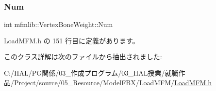 \mbox{\label{classmfmlib_1_1_vertex_bone_weight_ae5ef8b8e05724b82f358fa618cb0a9ef}} 
\subsubsection{\texorpdfstring{Num}{Num}}
{\footnotesize\ttfamily int mfmlib\+::\+Vertex\+Bone\+Weight\+::\+Num}



 Load\+M\+F\+M.\+h の 151 行目に定義があります。



このクラス詳解は次のファイルから抽出されました\+:\begin{DoxyCompactItemize}
\item 
C\+:/\+H\+A\+L/\+P\+G関係/03\+\_\+作成プログラム/03\+\_\+\+H\+A\+L授業/就職作品/\+Project/source/05\+\_\+\+Resource/\+Model\+F\+B\+X/\+Load\+M\+F\+M/\mbox{\hyperlink{_load_m_f_m_8h}{Load\+M\+F\+M.\+h}}\end{DoxyCompactItemize}
